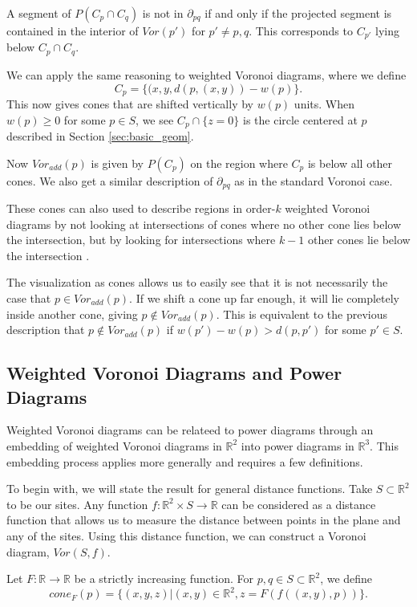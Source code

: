 \documentclass[a4paper, 11pt]{article}
\newcommand{\R}{\mathbb{R}}
\begin{document}
A segment of $P( C_p \cap C_q)$ is not in $\partial_{pq}$ if and only if the projected segment is contained in the interior of $Vor(p')$ for $p'
\neq p, q$. This corresponds to $C_{p'}$ lying below $C_p \cap C_q$.

We can apply the same reasoning to weighted Voronoi diagrams, where we define
\[ C_p = \{ (x, y, d(p, (x,y)) - w(p) \}. \]
This now gives cones that are shifted vertically by $w(p)$ units.  When $w(p) \geq 0$ for some $p \in S$, we see $C_p \cap \{ z = 0 \}$ is the circle
centered at $p$ described in Section \ref{sec:basic_geom}.

Now $Vor_{add}(p)$ is given by $P(C_p)$ on the region where $C_p$ is below all other
cones. We also get a similar description of $\partial_{pq}$ as in the standard Voronoi case.

These cones can also used to describe regions in order-$k$ weighted Voronoi diagrams by not looking at intersections of cones where no other
cone lies below the intersection, but by looking for intersections where $k-1$ other cones lie below the intersection \cite{rosenberger_additive}.

The visualization as cones allows us to easily see that it is not necessarily the case that $p \in Vor_{add}(p)$. If we shift a cone up far enough, it
will lie completely inside another cone, giving $p \notin Vor_{add}(p)$. This is equivalent to the previous description that $p \notin Vor_{add}(p)$
if $w(p') - w(p) > d(p,p')$ for some $p' \in S$.

\subsection{Weighted Voronoi Diagrams and Power Diagrams}

Weighted Voronoi diagrams can be relateed to power diagrams through an embedding of weighted Voronoi diagrams in $\R^2$ into power diagrams in $\R^3$.
This embedding process applies more generally and requires a few definitions.

To begin with, we will state the result for general distance functions. Take $S \subset \R^2$ to be our sites. Any function $f: \R^2 \times S \to \R$
can be considered as a distance function that allows us to measure the distance between points in the plane and any of the sites. Using this distance
function, we can construct a Voronoi diagram, $Vor(S,f)$.

Let $F: \R \to \R$ be a strictly increasing function. For $p,q \in S \subset \R^2$, we define
\[ cone_F(p) = \{ (x,y,z) | (x,y) \in \R^2, z = F( f( (x,y), p) ) \}. \]
\end{document}
